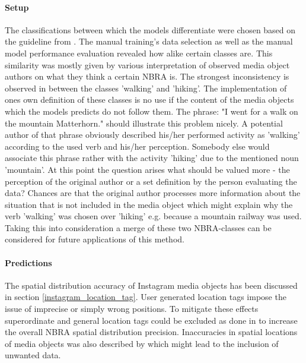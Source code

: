 \paragraph*{Setup} 
The classifications between which the models differentiate were chosen based on the guideline from \parencite{IFL2018}. The manual training's data selection as well as the manual model performance evaluation revealed how alike certain classes are. This similarity was mostly given by various interpretation of observed media object authors on what they think a certain NBRA is. The strongest inconsistency is observed in between the classes 'walking' and 'hiking'. The implementation of ones own definition of these classes is no use if the content of the media objects which the models predicts do not follow them. The phrase: "I went for a walk on the mountain Matterhorn." should illustrate this problem nicely. A potential author of that phrase obviously described his/her performed activity as 'walking' according to the used verb and his/her perception. Somebody else would associate this phrase rather with the activity 'hiking' due to the mentioned noun 'mountain'. At this point the question arises what should be valued more - the perception of the original author or a set definition by the person evaluating the data? Chances are that the original author processes more information about the situation that is not included in the media object which might explain why the verb 'walking' was chosen over 'hiking' e.g. because a mountain railway was used. 
Taking this into consideration a merge of these two NBRA-classes can be considered for future applications of this method.

\paragraph*{Predictions}
The spatial distribution accuracy of Instagram media objects has been discussed in section \ref{instagram_location_tag}. User generated location tags impose the issue of imprecise or simply wrong positions. To mitigate these effects superordinate and general location tags could be excluded as done in \parencite{Heikinheimo2017} to increase the overall NBRA spatial distribution precision. Inaccuracies in spatial locations of media objects was also described by \parencite{Lee2016} which might lead to the inclusion of unwanted data.


